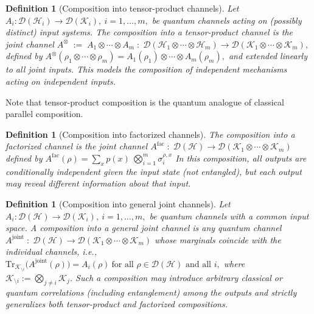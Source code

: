 \documentclass[11pt]{article}
\def\Tr{\mathrm{Tr}}
\theoremstyle{plain}
\newtheorem{definition}[theo]{Definition}
\theoremstyle{remark}
\begin{document}
\begin{definition}[Composition into tensor-product channels]
Let
$A_i:\mathcal{D}(\mathcal{H}_i)\to\mathcal{D}(\mathcal{K}_i),
\ i=1,\ldots,m,$
be quantum channels acting on (possibly distinct) input systems.
The \emph{composition into a tensor-product channel} is the joint channel
$
A^{\otimes}
\;:=\;
A_1\otimes\cdots\otimes A_m
\;:\;
\mathcal{D}(\mathcal{H}_1\otimes\cdots\otimes\mathcal{H}_m)
\to
\mathcal{D}(\mathcal{K}_1\otimes\cdots\otimes\mathcal{K}_m),
$
defined by
$
A^{\otimes}(\rho_1\otimes\cdots\otimes\rho_m)
=
A_1(\rho_1)\otimes\cdots\otimes A_m(\rho_m),
$
and extended linearly to all joint inputs.
This models the composition of \emph{independent mechanisms acting on independent inputs}.
\label{def:tensor-product-composition}
\end{definition}

{Note that tensor-product composition is the quantum analogue of classical parallel composition.}


\begin{definition}[Composition into factorized channels]
The \emph{composition into a factorized channel} is the joint channel
$A^{\mathrm{fac}}
\;:\;
\mathcal{D}(\mathcal{H})
\to
\mathcal{D}(\mathcal{K}_1\otimes\cdots\otimes\mathcal{K}_m)$
defined by 
$A^{\mathrm{fac}}(\rho)  =\sum_{x} p(x) \ \bigotimes_{i=1}^m \sigma_i^{\rho,x}$
In this composition, all outputs are conditionally independent given the input
state (not entangled), but each output may reveal different information about that input.
\label{def:factorized-composition}
\end{definition}

\begin{definition}[Composition into general joint channels]
Let
$
A_i:\mathcal{D}(\mathcal{H})\to\mathcal{D}(\mathcal{K}_i),
\ i=1,\ldots,m,
$
be quantum channels with a common input space.
A \emph{composition into a general joint channel} is any quantum channel
$
A^{\mathrm{joint}}
\;:\;
\mathcal{D}(\mathcal{H})
\to
\mathcal{D}(\mathcal{K}_1\otimes\cdots\otimes\mathcal{K}_m)
$
whose marginals coincide with the individual channels, i.e.,
$
\Tr_{\mathcal{K}_{\setminus i}}\!\big(A^{\mathrm{joint}}(\rho)\big)
=
A_i(\rho)
\ \text{for all }\rho\in\mathcal{D}(\mathcal{H})\text{ and all }i,
$
where $\mathcal{K}_{\setminus i}:=\bigotimes_{j\neq i}\mathcal{K}_j$.
Such a composition may introduce arbitrary classical or quantum correlations (including
entanglement) among the outputs and strictly generalizes both tensor-product and factorized
compositions.
\label{def:joint-composition}
\end{definition}
\end{document}
